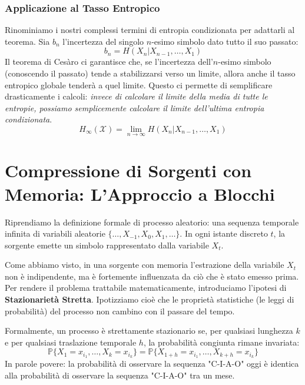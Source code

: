 \subsubsection{Applicazione al Tasso Entropico}
Rinominiamo i nostri complessi termini di entropia condizionata per adattarli al teorema. Sia $b_n$ l'incertezza del singolo $n$-esimo simbolo dato tutto il suo passato:
\begin{equation}
    b_n = H(X_n | X_{n-1}, \dots, X_1)
\end{equation}
Il teorema di Cesàro ci garantisce che, se l'incertezza dell'$n$-esimo simbolo (conoscendo il passato) tende a stabilizzarsi verso un limite, allora anche il tasso entropico globale tenderà a quel limite. 
Questo ci permette di semplificare drasticamente i calcoli: \textit{invece di calcolare il limite della media di tutte le entropie, possiamo semplicemente calcolare il limite dell'ultima entropia condizionata}.
\begin{equation}
    \boxed{ H_\infty(\mathcal{X}) = \lim_{n \to \infty} H(X_n | X_{n-1}, \dots, X_1) }
\end{equation}


\section{Compressione di Sorgenti con Memoria: L'Approccio a Blocchi}

Riprendiamo la definizione formale di processo aleatorio: una sequenza temporale infinita di variabili aleatorie $\{\dots, X_{-1}, X_0, X_1, \dots\}$. In ogni istante discreto $t$, la sorgente emette un simbolo rappresentato dalla variabile $X_t$.

Come abbiamo visto, in una sorgente con memoria l'estrazione della variabile $X_t$ non è indipendente, ma è fortemente influenzata da ciò che è stato emesso prima. 
Per rendere il problema trattabile matematicamente, introduciamo l'ipotesi di \textbf{Stazionarietà Stretta}. Ipotizziamo cioè che le proprietà statistiche (le leggi di probabilità) del processo non cambino con il passare del tempo. 

Formalmente, un processo è strettamente stazionario se, per qualsiasi lunghezza $k$ e per qualsiasi traslazione temporale $h$, la probabilità congiunta rimane invariata:
\begin{equation}
    \mathbb{P}\{X_1 = x_{i_1}, \dots, X_k = x_{i_k}\} = \mathbb{P}\{X_{1+h} = x_{i_1}, \dots, X_{k+h} = x_{i_k}\}
\end{equation}
In parole povere: la probabilità di osservare la sequenza "C-I-A-O" oggi è identica alla probabilità di osservare la sequenza "C-I-A-O" tra un mese.

